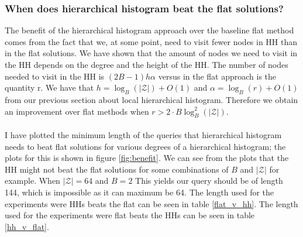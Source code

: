 \documentclass[11pt]{article}
\theoremstyle{definition}
\begin{document}
\subsubsection{When does hierarchical histogram beat the flat solutions?}
The benefit of the hierarchical histogram approach over the baseline flat method comes from the fact that we, at some point, need to visit fewer nodes in HH than in the flat solutions. We have shown that the amount of nodes we need to visit in the HH depends on the degree and the height of the HH. The number of nodes needed to visit in the HH is $(2B-1)h\alpha$ versus in the flat approach is the quantity r. We have that $h=\log_B(|\mathcal{Z}|)+O(1)$ and $\alpha=\log_B(r)+O(1)$ from our previous section about local hierarchical histogram. Therefore we obtain an improvement over flat methods when $r>2\cdot B \log_B^2(|\mathcal{Z}|)$. \\ \\ I have plotted the minimum length of the queries that hierarchical histogram needs to beat flat solutions for various degrees of a hierarchical histogram; the plots for this is shown in figure \ref{fig:benefit}. We can see from the plots that the HH might not beat the flat solutions for some combinations of $B$ and $|\mathcal{Z}|$ for example. When $|\mathcal{Z}| = 64$ and $B=2$ This yields our query should be of length 144, which is impossible as it can maximum be 64. The length used for the experiments were HHs beats the flat can be seen in table \ref{flat_v_hh}. The length used for the experiments were flat beats the HHs can be seen in table \ref{hh_v_flat}. 
\end{document}
